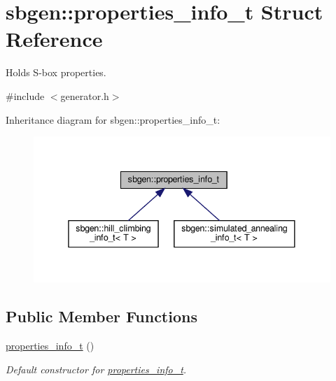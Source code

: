 \hypertarget{structsbgen_1_1properties__info__t}{}\section{sbgen\+:\+:properties\+\_\+info\+\_\+t Struct Reference}
\label{structsbgen_1_1properties__info__t}


Holds S-\/box properties.  




{\ttfamily \#include $<$generator.\+h$>$}



Inheritance diagram for sbgen\+:\+:properties\+\_\+info\+\_\+t\+:
\nopagebreak
\begin{figure}[H]
\begin{center}
\leavevmode
\includegraphics[width=338pt]{structsbgen_1_1properties__info__t__inherit__graph}
\end{center}
\end{figure}
\subsection*{Public Member Functions}
\begin{DoxyCompactItemize}
\item 
\mbox{\label{structsbgen_1_1properties__info__t_a3c36c37f62442e2a810e4b7f522908b2}} 
\hyperlink{structsbgen_1_1properties__info__t_a3c36c37f62442e2a810e4b7f522908b2}{properties\+\_\+info\+\_\+t} ()
\begin{DoxyCompactList}\small\item\em Default constructor for \hyperlink{structsbgen_1_1properties__info__t}{properties\+\_\+info\+\_\+t}. \end{DoxyCompactList}\end{DoxyCompactItemize}
